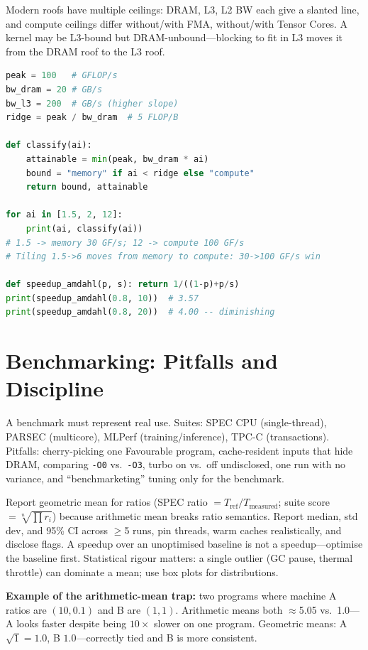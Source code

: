 Modern roofs have multiple ceilings: DRAM, L3, L2 BW each give a slanted line, and
compute ceilings differ without/with FMA, without/with Tensor Cores. A kernel may be
L3-bound but DRAM-unbound---blocking to fit in L3 moves it from the DRAM roof to the L3
roof.

\begin{lstlisting}[language=Python, caption={Roofline classification and attainable performance.}]
peak = 100   # GFLOP/s
bw_dram = 20 # GB/s
bw_l3 = 200  # GB/s (higher slope)
ridge = peak / bw_dram  # 5 FLOP/B

def classify(ai):
    attainable = min(peak, bw_dram * ai)
    bound = "memory" if ai < ridge else "compute"
    return bound, attainable

for ai in [1.5, 2, 12]:
    print(ai, classify(ai))
# 1.5 -> memory 30 GF/s; 12 -> compute 100 GF/s
# Tiling 1.5->6 moves from memory to compute: 30->100 GF/s win

def speedup_amdahl(p, s): return 1/((1-p)+p/s)
print(speedup_amdahl(0.8, 10))  # 3.57
print(speedup_amdahl(0.8, 20))  # 4.00 -- diminishing
\end{lstlisting}

\section{Benchmarking: Pitfalls and Discipline}
A benchmark must represent real use. Suites: SPEC CPU (single-thread), PARSEC
(multicore), MLPerf (training/inference), TPC-C (transactions). Pitfalls: cherry-picking
one Favourable program, cache-resident inputs that hide DRAM, comparing \texttt{-O0}
vs.\ \texttt{-O3}, turbo on vs.\ off undisclosed, one run with no variance, and
``benchmarketing'' tuning only for the benchmark.

Report geometric mean for ratios (SPEC ratio $=T_{\text{ref}}/T_{\text{measured}}$;
suite score $=\sqrt[n]{\prod r_i}$) because arithmetic mean breaks ratio semantics.
Report median, std dev, and 95\% CI across $\ge$5 runs, pin threads, warm caches
realistically, and disclose flags. A speedup over an unoptimised baseline is not a
speedup---optimise the baseline first. Statistical rigour matters: a single outlier
(GC pause, thermal throttle) can dominate a mean; use box plots for distributions.

\textbf{Example of the arithmetic-mean trap:} two programs where machine A ratios are
$(10,0.1)$ and B are $(1,1)$. Arithmetic means both $\approx$5.05 vs.\ 1.0---A looks
faster despite being $10\times$ slower on one program. Geometric means: A
$\sqrt{1}=1.0$, B $1.0$---correctly tied and B is more consistent.


